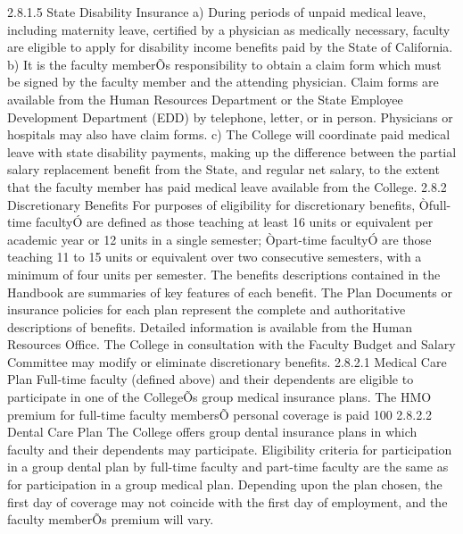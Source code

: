 \documentclass[letterpaper, 11pt]{article}
\begin{document}
2.8.1.5 State Disability Insurance
a) During periods of unpaid medical leave, including maternity leave, certified by a physician as medically necessary, faculty are eligible to apply for disability income benefits paid by the State of California.
b) It is the faculty memberÕs responsibility to obtain a claim form which must be signed by the faculty member and the attending physician.  Claim forms are available from the Human Resources Department or the State Employee Development Department (EDD) by telephone, letter, or in person.  Physicians or hospitals may also have claim forms.
c) The College will coordinate paid medical leave with state disability payments, making up the difference between the partial salary replacement benefit from the State, and regular net salary, to the extent that the faculty member has paid medical leave available from the College.
2.8.2 Discretionary Benefits 
   For purposes of eligibility for discretionary benefits, Òfull-time facultyÓ are defined as those teaching at least 16 units or equivalent per academic year or 12 units in a single semester; Òpart-time facultyÓ are those teaching 11 to 15 units or equivalent over two consecutive semesters, with a minimum of four units per semester.  The benefits descriptions contained in the Handbook are summaries of key features of each benefit.  The Plan Documents or insurance policies for each plan represent the complete and authoritative descriptions of benefits.  Detailed information is available from the Human Resources Office.  The College in consultation with the Faculty Budget and Salary Committee may modify or eliminate discretionary benefits.
2.8.2.1 Medical Care Plan
   Full-time faculty (defined above) and their dependents are eligible to participate in one of the CollegeÕs group medical insurance plans.  The HMO premium for full-time faculty membersÕ personal coverage is paid 100%
2.8.2.2 Dental Care Plan
   The College offers group dental insurance plans in which faculty and their dependents may participate.  Eligibility criteria for participation in a group dental plan by full-time faculty and part-time faculty are the same as for participation in a group medical plan.  Depending upon the plan chosen, the first day of coverage may not coincide with the first day of employment, and the faculty memberÕs premium will vary.
\end{document}
